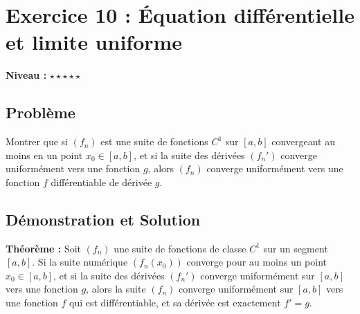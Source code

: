 \documentclass{report}
\begin{document}
\newpage


\chapter*{Exercice 10 : Équation différentielle et limite uniforme}

\textbf{Niveau :} $\star \star \star \star \star $

\section*{Problème}

Montrer que si $(f_n)$ est une suite de fonctions $C^1$ sur $[a,b]$ convergeant au moins en un point $x_0 \in [a,b]$, et si la suite des dérivées $(f_n')$ converge uniformément vers une fonction $g$, alors $(f_n)$ converge uniformément vers une fonction $f$ différentiable de dérivée $g$.

\section*{Démonstration et Solution}

\textbf{Théorème :} Soit $(f_n)$ une suite de fonctions de classe $C^1$ sur un segment $[a,b]$. Si la suite numérique $(f_n(x_0))$ converge pour au moins un point $x_0 \in [a,b]$, et si la suite des dérivées $(f_n')$ converge uniformément sur $[a,b]$ vers une fonction $g$, alors la suite $(f_n)$ converge uniformément sur $[a,b]$ vers une fonction $f$ qui est différentiable, et sa dérivée est exactement $f' = g$.
\end{document}
